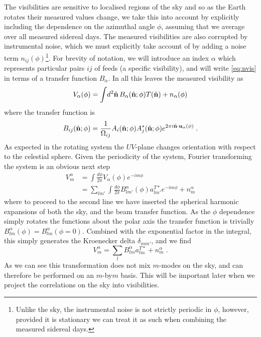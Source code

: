 \documentclass[prd,twocolumn,nofootinbib]{revtex4}
\begin{document}
The visibilities are sensitive to localised regions of the sky and so as the
Earth rotates their measured values change, we take this into account by
explicitly including the dependence on the azimuthal angle $\phi$, assuming that
we average over all measured sidereal days. The measured visibilities are also
corrupted by instrumental noise, which we must explicitly take account of by
adding a noise term $n_{ij}(\phi)$\footnote{Unlike the sky, the instrumental
  noise is not strictly periodic in $\phi$, however, provided it is stationary
  we can treat it as such when combining the measured sidereal days.}. For
brevity of notation, we will introduce an index $\alpha$ which represents
particular pairs $ij$ of feeds (a specific visibility), and will write
\eqref{eq:nvis} in terms of a transfer function $B_\alpha$. In all this leaves
the measured visibility as
\begin{equation}
  V_\alpha(\phi) = \int \! d^2\hat{\mathbf{n}}\, B_\alpha(\hat{\mathbf{n}}; \phi) T(\hat{\mathbf{n}}) + n_\alpha(\phi)
\end{equation}
where the transfer function is
\begin{equation}
  B_{ij}(\hat{\mathbf{n}}; \phi) = \frac{1}{\Omega_{ij}}A_i(\hat{\mathbf{n}}; \phi) A_j^*(\hat{\mathbf{n}};
  \phi) e^{2 \pi i \hat{\mathbf{n}} \cdot\mathbf{u}_{\alpha}(\phi)} \; .
\end{equation}
As expected in the rotating system the $UV$-plane changes orientation with
respect to the celestial sphere. Given the periodicity of the system, Fourier
transforming the system is an obvious next step
\begin{align}
  V^\alpha_m &= \int \frac{d\phi}{2\pi} V_\alpha(\phi) e^{-i m \phi} \\
  & = \sum_{l m'}\int \frac{d\phi}{2\pi} B^\alpha_{l m'}(\phi) a^{T*}_{l m'}
  e^{-i m \phi}+ n^\alpha_m
\end{align}
where to proceed to the second line we have inserted the spherical harmonic
expansions of both the sky, and the beam transfer function. As the $\phi$
dependence simply rotates the functions about the polar axis the transfer
function is trivially $B^\alpha_{lm}(\phi) = B^{\alpha}_{lm}(\phi=0)$. Combined
with the exponential factor in the integral, this simply generates the
Kroenecker delta $\delta_{mm'}$, and we find
\begin{equation}
\label{eq:vis_unpol}
V^\alpha_m = \sum_{l} B^\alpha_{l m} a^{T*}_{l m}+ n^\alpha_m \; .
\end{equation}
As we can see this transformation does not mix $m$-modes on the sky, and can
therefore be performed on an $m$-by$m$ basis. This will be important later when
we project the correlations on the sky into visibilities.
\end{document}
